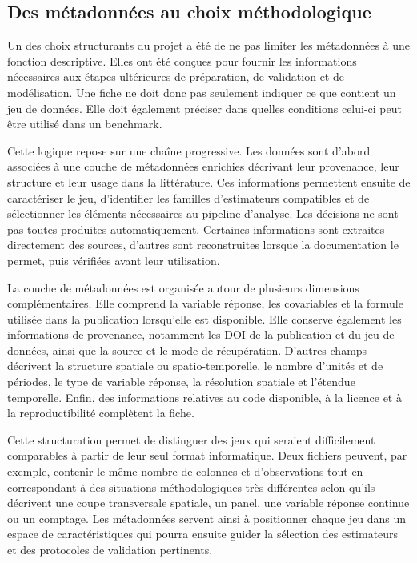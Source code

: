 \documentclass[11pt,a4paper]{article}
\begin{document}
\subsection{Des métadonnées au choix méthodologique}

Un des choix structurants du projet a été de ne pas limiter les métadonnées à une fonction descriptive. Elles ont été conçues pour fournir les informations nécessaires aux étapes ultérieures de préparation, de validation et de modélisation. Une fiche ne doit donc pas seulement indiquer ce que contient un jeu de données. Elle doit également préciser dans quelles conditions celui-ci peut être utilisé dans un benchmark.

Cette logique repose sur une chaîne progressive. Les données sont d'abord associées à une couche de métadonnées enrichies décrivant leur provenance, leur structure et leur usage dans la littérature. Ces informations permettent ensuite de caractériser le jeu, d'identifier les familles d'estimateurs compatibles et de sélectionner les éléments nécessaires au pipeline d'analyse. Les décisions ne sont pas toutes produites automatiquement. Certaines informations sont extraites directement des sources, d'autres sont reconstruites lorsque la documentation le permet, puis vérifiées avant leur utilisation.

La couche de métadonnées est organisée autour de plusieurs dimensions complémentaires. Elle comprend la variable réponse, les covariables et la formule utilisée dans la publication lorsqu'elle est disponible. Elle conserve également les informations de provenance, notamment les DOI de la publication et du jeu de données, ainsi que la source et le mode de récupération. D'autres champs décrivent la structure spatiale ou spatio-temporelle, le nombre d'unités et de périodes, le type de variable réponse, la résolution spatiale et l'étendue temporelle. Enfin, des informations relatives au code disponible, à la licence et à la reproductibilité complètent la fiche.

Cette structuration permet de distinguer des jeux qui seraient difficilement comparables à partir de leur seul format informatique. Deux fichiers peuvent, par exemple, contenir le même nombre de colonnes et d'observations tout en correspondant à des situations méthodologiques très différentes selon qu'ils décrivent une coupe transversale spatiale, un panel, une variable réponse continue ou un comptage. Les métadonnées servent ainsi à positionner chaque jeu dans un espace de caractéristiques qui pourra ensuite guider la sélection des estimateurs et des protocoles de validation pertinents.
\end{document}
